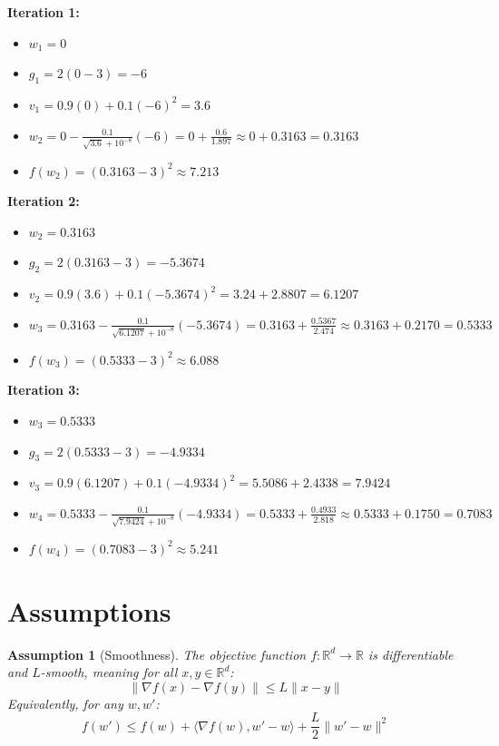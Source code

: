 \documentclass{article}
\newtheorem{assumption}{Assumption}
\begin{document}
\textbf{Iteration 1:}
\begin{itemize}
\item $w_1 = 0$
\item $g_1 = 2(0 - 3) = -6$
\item $v_1 = 0.9(0) + 0.1(-6)^2 = 3.6$
\item $w_2 = 0 - \frac{0.1}{\sqrt{3.6} + 10^{-8}} (-6) = 0 + \frac{0.6}{1.897} \approx 0 + 0.3163 = 0.3163$
\item $f(w_2) = (0.3163 - 3)^2 \approx 7.213$
\end{itemize}

\textbf{Iteration 2:}
\begin{itemize}
\item $w_2 = 0.3163$
\item $g_2 = 2(0.3163 - 3) = -5.3674$
\item $v_2 = 0.9(3.6) + 0.1(-5.3674)^2 = 3.24 + 2.8807 = 6.1207$
\item $w_3 = 0.3163 - \frac{0.1}{\sqrt{6.1207} + 10^{-8}} (-5.3674) = 0.3163 + \frac{0.5367}{2.474} \approx 0.3163 + 0.2170 = 0.5333$
\item $f(w_3) = (0.5333 - 3)^2 \approx 6.088$
\end{itemize}

\textbf{Iteration 3:}
\begin{itemize}
\item $w_3 = 0.5333$
\item $g_3 = 2(0.5333 - 3) = -4.9334$
\item $v_3 = 0.9(6.1207) + 0.1(-4.9334)^2 = 5.5086 + 2.4338 = 7.9424$
\item $w_4 = 0.5333 - \frac{0.1}{\sqrt{7.9424} + 10^{-8}} (-4.9334) = 0.5333 + \frac{0.4933}{2.818} \approx 0.5333 + 0.1750 = 0.7083$
\item $f(w_4) = (0.7083 - 3)^2 \approx 5.241$
\end{itemize}

\newpage
\section*{Assumptions}
\begin{assumption}[Smoothness]
The objective function $f: \mathbb{R}^d \to \mathbb{R}$ is differentiable and $L$-smooth, meaning for all $x, y \in \mathbb{R}^d$:
$$ \|\nabla f(x) - \nabla f(y)\| \leq L \|x - y\| $$
Equivalently, for any $w, w'$:
$$ f(w') \leq f(w) + \langle \nabla f(w), w' - w \rangle + \frac{L}{2} \|w' - w\|^2 $$
\end{assumption}
\end{document}
